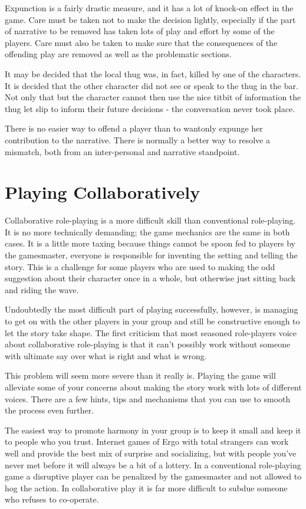 \documentclass[twoside]{book}
\begin{document}
Expunction is a fairly drastic measure, and it has a lot of knock-on
effect in the game. Care must be taken not to make the decision
lightly, especially if the part of narrative to be removed has taken
lots of play and effort by some of the players. Care must also be
taken to make sure that the consequences of the offending play are
removed as well as the problematic sections.

It may be decided that the local thug was, in fact, killed by one of
the characters. It is decided that the other character did not see or
speak to the thug in the bar. Not only that but the character cannot
then use the nice titbit of information the thug let slip to inform
their future decisions - the conversation never took place.

There is no easier way to offend a player than to wantonly expunge her
contribution to the narrative. There is normally a better way to
resolve a mismatch, both from an inter-personal and narrative
standpoint.

\chapter{Playing Collaboratively}

Collaborative role-playing is a more difficult skill than conventional
role-playing. It is no more technically demanding; the game mechanics
are the same in both cases. It is a little more taxing because things
cannot be spoon fed to players by the gamesmaster, everyone is
responsible for inventing the setting and telling the story. This is a
challenge for some players who are used to making the odd suggestion
about their character once in a whole, but otherwise just sitting back
and riding the wave.

Undoubtedly the most difficult part of playing successfully, however,
is managing to get on with the other players in your group and still
be constructive enough to let the story take shape. The first
criticism that most seasoned role-players voice about collaborative
role-playing is that it can't possibly work without someone with
ultimate say over what is right and what is wrong.

This problem will seem more severe than it really is. Playing the game
will alleviate some of your concerns about making the story work with
lots of different voices. There are a few hints, tips and mechanisms
that you can use to smooth the process even further.

The easiest way to promote harmony in your group is to keep it small
and keep it to people who you trust. Internet games of Ergo with total
strangers can work well and provide the best mix of surprise and
socializing, but with people you've never met before it will always be
a bit of a lottery. In a conventional role-playing game a disruptive
player can be penalized by the gamesmaster and not allowed to hog the
action. In collaborative play it is far more difficult to subdue
someone who refuses to co-operate.
\end{document}
